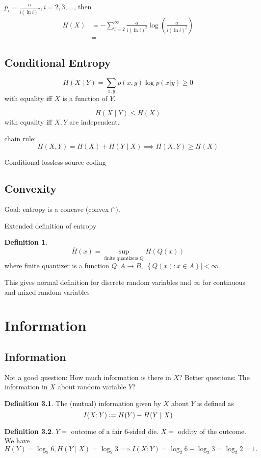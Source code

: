 \documentclass{report}
\newcommand{\set}[1]{\left\lbrace #1 \right\rbrace}
\newcommand{\defeq}{\vcentcolon=}
\theoremstyle{definition}
\newtheorem{definition}{Definition}[section]
\theoremstyle{remark}
\numberwithin{equation}{section}
\begin{document}
$p_i = \frac{\alpha}{i(\ln i)^2}, i = 2, 3, \ldots$, then \begin{align*}
  H(X) & = -\sum_{i=2}^\infty \frac{\alpha}{i(\ln i)^2} \log \left(\frac{\alpha}{i(\ln i)^2}\right) \\
  & = 
\end{align*}

\section{Conditional Entropy}

\[H(X \mid Y) = \sum_{x, y} p(x, y) \log p(x|y) \geq 0\] with equality iff $X$ is a function of $Y$.

\[H(X \mid Y) \leq H(X)\] with equality iff $X, Y$ are independent. 

chain rule: \[
  H(X, Y) = H(X) + H(Y \mid X) \implies H(X, Y) \geq H(X) 
\]

Conditional lossless source coding

\section{Convexity}
Goal: entropy is a concave (convex $\cap$).

Extended definition of entropy 
\begin{definition}
  \[\overline{H}(x) = \sup_{\text{finite quantizers $Q$}} H(Q(x)) \] where finite quantizer is a function $Q: A \to B, |\set{Q(x): x \in A}| < \infty$.
\end{definition}
This gives normal definition for discrete random variables and $\infty$ for continuous and mixed random variables

\chapter{Information}

\section{Information}
Not a good question: How much information is there in $X$?
Better questions: The information in $X$ about random variable $Y$?

\begin{definition}
  The (mutual) information given by $X$ about $Y$ is defined as
  \[I(X; Y) \defeq H(Y) - H(Y \mid X)\]
\end{definition}
\begin{definition}
  $Y =$ outcome of a fair $6$-sided die. $X = $ oddity of the outcome. We have \[
  H(Y) = \log_2 6, H(Y \mid X) = \log_2 3 \implies I(X; Y) = \log_2 6 - \log_2 3 = \log_2 2 = 1.  
  \]
\end{definition}
\end{document}
